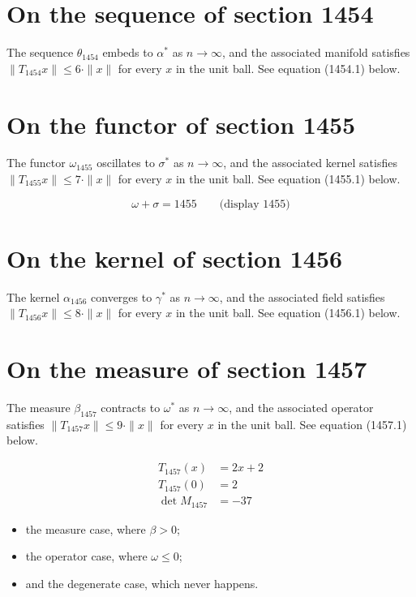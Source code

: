 \documentclass{article}
\begin{document}
\section{On the sequence of section 1454}
The sequence $\theta_{1454}$ embeds to $\alpha^{*}$ as $n \to \infty$,
and the associated manifold satisfies $\|T_{1454} x\| \leq 6 \cdot \|x\|$
for every $x$ in the unit ball. See equation (1454.1) below.

\section{On the functor of section 1455}
The functor $\omega_{1455}$ oscillates to $\sigma^{*}$ as $n \to \infty$,
and the associated kernel satisfies $\|T_{1455} x\| \leq 7 \cdot \|x\|$
for every $x$ in the unit ball. See equation (1455.1) below.

$$
\omega + \sigma = 1455 \qquad \text{(display 1455)}
$$

\section{On the kernel of section 1456}
The kernel $\alpha_{1456}$ converges to $\gamma^{*}$ as $n \to \infty$,
and the associated field satisfies $\|T_{1456} x\| \leq 8 \cdot \|x\|$
for every $x$ in the unit ball. See equation (1456.1) below.

\section{On the measure of section 1457}
The measure $\beta_{1457}$ contracts to $\omega^{*}$ as $n \to \infty$,
and the associated operator satisfies $\|T_{1457} x\| \leq 9 \cdot \|x\|$
for every $x$ in the unit ball. See equation (1457.1) below.

\begin{align}
T_{1457}(x) &= 2 x + 2 \\
T_{1457}(0) &= 2 \\
\det M_{1457} &= -37
\end{align}

\begin{itemize}
  \item the measure case, where $\beta > 0$;
  \item the operator case, where $\omega \leq 0$;
  \item and the degenerate case, which never happens.
\end{itemize}
\end{document}

